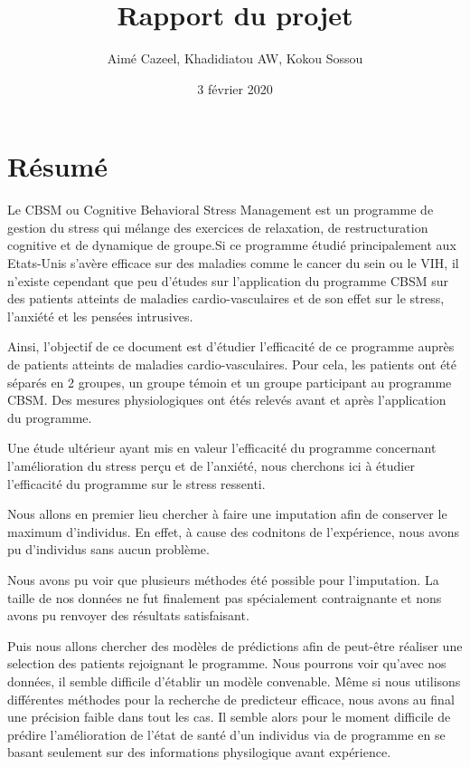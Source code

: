 \documentclass[]{article}
\title{Rapport du projet}
\author{Aimé Cazeel, Khadidiatou AW, Kokou Sossou}
\date{3 février 2020}
\begin{document}
\maketitle

{
\setcounter{tocdepth}{2}
\tableofcontents
}
\newpage

\hypertarget{resume}{%
\section{Résumé}\label{resume}}

Le CBSM ou Cognitive Behavioral Stress Management est un programme de
gestion du stress qui mélange des exercices de relaxation, de
restructuration cognitive et de dynamique de groupe.Si ce programme
étudié principalement aux Etats-Unis s'avère efficace sur des maladies
comme le cancer du sein ou le VIH, il n'existe cependant que peu
d'études sur l'application du programme CBSM sur des patients atteints
de maladies cardio-vasculaires et de son effet sur le stress, l'anxiété
et les pensées intrusives.

Ainsi, l'objectif de ce document est d'étudier l'efficacité de ce
programme auprès de patients atteints de maladies cardio-vasculaires.
Pour cela, les patients ont été séparés en 2 groupes, un groupe témoin
et un groupe participant au programme CBSM. Des mesures physiologiques
ont étés relevés avant et après l'application du programme.

Une étude ultérieur ayant mis en valeur l'efficacité du programme
concernant l'amélioration du stress perçu et de l'anxiété, nous
cherchons ici à étudier l'efficacité du programme sur le stress
ressenti.

Nous allons en premier lieu chercher à faire une imputation afin de
conserver le maximum d'individus. En effet, à cause des codnitons de
l'expérience, nous avons pu d'individus sans aucun problème.

Nous avons pu voir que plusieurs méthodes été possible pour
l'imputation. La taille de nos données ne fut finalement pas
spécialement contraignante et nons avons pu renvoyer des résultats
satisfaisant.

Puis nous allons chercher des modèles de prédictions afin de peut-être
réaliser une selection des patients rejoignant le programme. Nous
pourrons voir qu'avec nos données, il semble difficile d'établir un
modèle convenable. Même si nous utilisons différentes méthodes pour la
recherche de predicteur efficace, nous avons au final une précision
faible dans tout les cas. Il semble alors pour le moment difficile de
prédire l'amélioration de l'état de santé d'un individus via de
programme en se basant seulement sur des informations physilogique avant
expérience.
\end{document}
